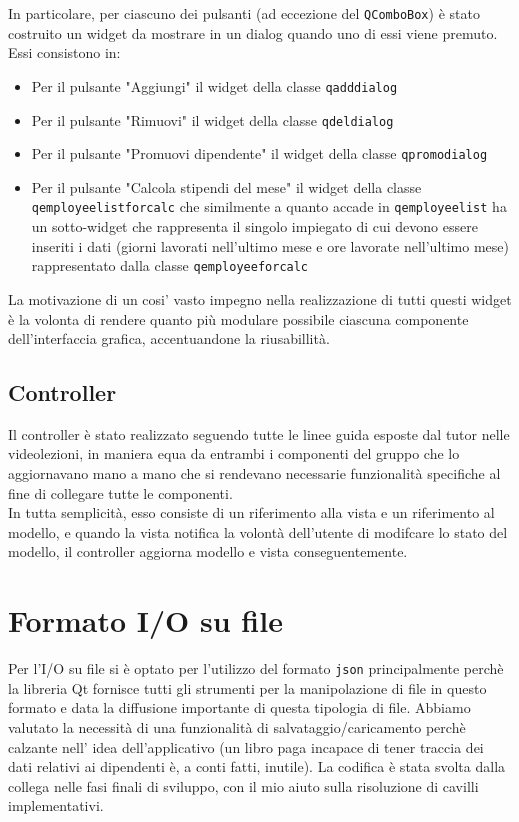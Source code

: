 \documentclass[a4paper,10pt]{article}
\begin{document}
In particolare, per ciascuno dei pulsanti (ad eccezione del \verb+QComboBox+) è stato costruito un widget da mostrare in un dialog quando uno di essi viene premuto. Essi consistono in:
\begin{itemize}
\item Per il pulsante "Aggiungi" il widget della classe \verb+qadddialog+
\item Per il pulsante "Rimuovi" il widget della classe \verb+qdeldialog+
\item Per il pulsante "Promuovi dipendente" il widget della classe \verb+qpromodialog+
\item Per il pulsante "Calcola stipendi del mese" il widget della classe \verb+qemployeelistforcalc+ che similmente a quanto accade in \verb+qemployeelist+ ha un sotto-widget che rappresenta il singolo impiegato di cui devono essere inseriti i dati (giorni lavorati nell'ultimo mese e ore lavorate nell'ultimo mese) rappresentato dalla classe \verb+qemployeeforcalc+ 
\end{itemize}

La motivazione di un cosi' vasto impegno nella realizzazione di tutti questi widget è la volonta di rendere quanto più modulare possibile ciascuna componente dell'interfaccia grafica, accentuandone la riusabillità.

\subsection{Controller}
Il controller è stato realizzato seguendo tutte le linee guida esposte dal tutor nelle videolezioni, in maniera equa da entrambi i componenti del gruppo che lo aggiornavano mano a mano che si rendevano necessarie funzionalità specifiche al fine di collegare tutte le componenti.\\ In tutta semplicità, esso consiste di un riferimento alla vista e un riferimento al modello, e quando la vista notifica la volontà dell'utente di modifcare lo stato del modello, il controller aggiorna modello e vista conseguentemente.  

\section{Formato I/O su file}
Per l'I/O su file si è optato per l'utilizzo del formato \verb+json+ principalmente perchè la libreria Qt fornisce tutti gli strumenti per la manipolazione di file in questo formato e data la diffusione importante di questa tipologia di file. Abbiamo valutato la necessità di una funzionalità di salvataggio/caricamento perchè calzante nell' idea dell'applicativo (un libro paga incapace di tener traccia dei dati relativi ai dipendenti è, a conti fatti, inutile). La codifica è stata svolta dalla collega nelle fasi finali di sviluppo, con il mio aiuto sulla risoluzione di cavilli implementativi.
\end{document}
